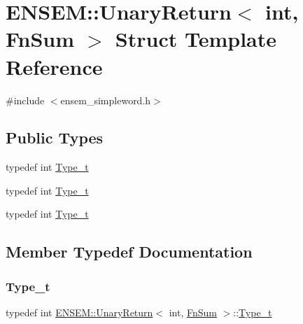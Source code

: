 \hypertarget{structENSEM_1_1UnaryReturn_3_01int_00_01FnSum_01_4}{}\section{E\+N\+S\+EM\+:\+:Unary\+Return$<$ int, Fn\+Sum $>$ Struct Template Reference}
\label{structENSEM_1_1UnaryReturn_3_01int_00_01FnSum_01_4}


{\ttfamily \#include $<$ensem\+\_\+simpleword.\+h$>$}

\subsection*{Public Types}
\begin{DoxyCompactItemize}
\item 
typedef int \mbox{\hyperlink{structENSEM_1_1UnaryReturn_3_01int_00_01FnSum_01_4_a0a0ed560534b6f9b4671d7bde05b28dc}{Type\+\_\+t}}
\item 
typedef int \mbox{\hyperlink{structENSEM_1_1UnaryReturn_3_01int_00_01FnSum_01_4_a0a0ed560534b6f9b4671d7bde05b28dc}{Type\+\_\+t}}
\item 
typedef int \mbox{\hyperlink{structENSEM_1_1UnaryReturn_3_01int_00_01FnSum_01_4_a0a0ed560534b6f9b4671d7bde05b28dc}{Type\+\_\+t}}
\end{DoxyCompactItemize}


\subsection{Member Typedef Documentation}
\mbox{\label{structENSEM_1_1UnaryReturn_3_01int_00_01FnSum_01_4_a0a0ed560534b6f9b4671d7bde05b28dc}} 
\subsubsection{\texorpdfstring{Type\_t}{Type\_t}\hspace{0.1cm}{\footnotesize\ttfamily [1/3]}}
{\footnotesize\ttfamily typedef int \mbox{\hyperlink{structENSEM_1_1UnaryReturn}{E\+N\+S\+E\+M\+::\+Unary\+Return}}$<$ int, \mbox{\hyperlink{structENSEM_1_1FnSum}{Fn\+Sum}} $>$\+::\mbox{\hyperlink{structENSEM_1_1UnaryReturn_3_01int_00_01FnSum_01_4_a0a0ed560534b6f9b4671d7bde05b28dc}{Type\+\_\+t}}}

